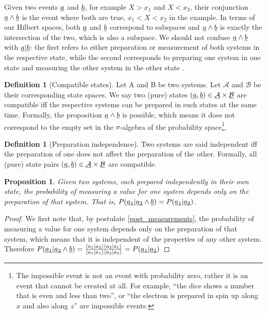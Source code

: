 \documentclass[aps,prl,amsmath,amssymb,twocolumn,nofootinbib]{revtex4}
\theoremstyle{plain}
\newtheorem{prop}[thrm]{Proposition}
\theoremstyle{definition}
\newtheorem{defn}[thrm]{Definition}
\theoremstyle{remark}
\newcommand{\pj}[1] {\underbar{$#1$}}
\def\>{\rangle}
\def\<{\langle}
\begin{document}
	{Given two events $\pj{a}$ and $\pj{b}$, for example $X > x_1$ and $X < x_2$, their conjunction $\pj{a} \wedge \pj{b}$ is the event where both are true, $ x_1 < X < x_2$ in the example. In terms of our Hilbert spaces, both $\pj{a}$ and $\pj{b}$ correspond to subspaces and $\pj{a} \wedge \pj{b}$ is exactly the intersection of the two, which is also a subspace. We should not confuse $\pj{a} \wedge \pj{b}$ with $\pj{a} | \pj{b}$: the first refers to either
		preparation or measurement of both systems  in the respective state, while the second corresponds to preparing one system in one state and measuring the
		other system in the other state \cite{cox}.}
	
	\begin{defn}[Compatible states]\label{def_compatible}
		Let A and B be two systems. Let ${\mathcal{A}}$ and ${\mathcal{B}}$
		be their corresponding state spaces. We say two (pure) states $(\pj{a},
		\pj{b}) \in \pj{\mathcal{A}} \times \pj{\mathcal{B}}$ are compatible
		iff the respective systems can be prepared in such states at the
		same time. Formally, the proposition $\pj{a} \wedge \pj{b}$ is
		possible, which means it does not correspond to the empty set in the
		$\sigma$-algebra of the probability space\footnote{The impossible event is not an event with probability zero, rather it is an event that cannot be created at all. For example, ``the dice shows a number that is even and less than two'', or ``the electron is prepared in spin up along $x$ and also along $z$'' are impossible events.}.
	\end{defn}
	
	\begin{defn}[Preparation independence]\label{def_indep}
		Two systems are said independent iff the preparation of one does not affect the preparation of the other. Formally, all (pure) state pairs $(\pj{a}, \pj{b}) \in \pj{\mathcal{A}}\times \pj{\mathcal{B}}$ are compatible.
	\end{defn}
	
	\begin{prop}\label{prop_singleBorn}
		Given two systems, each prepared independently in their own state, the probability of measuring a value for one system depends only on the preparation of that system. That is, $P(\pj{a_1}|\pj{a_2}\wedge \pj{b})=P(\pj{a_1}|\pj{a_2})$.
	\end{prop}
	\begin{proof}
		We first note that, by postulate \ref{post_measurements}, the probability of measuring a value for one system depends only on the preparation of that system, which means that it is independent of the properties of any other system. Therefore $P(\pj{a_1} | \pj{a_2} \wedge \pj{b}) = \frac{\<a_1| a_2 \> \< a_2 |a_1\>}{\< a_1 | a_1 \>\< a_2 | a_2 \>} = P(\pj{a_1} | \pj{a_2})$
	\end{proof}
	
\end{document}
